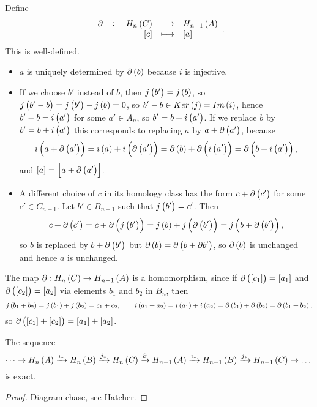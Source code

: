 Define
$$ \function[\partial]{H_n\br{C}}{H_{n - 1}\br{A}}{\sbr{c}}{\sbr{a}}. $$
This is well-defined.
\begin{itemize}
\item $ a $ is uniquely determined by $ \partial\br{b} $ because $ i $ is injective.
\item If we choose $ b' $ instead of $ b $, then $ j\br{b'} = j\br{b} $, so $ j\br{b' - b} = j\br{b'} - j\br{b} = 0 $, so $ b' - b \in Ker\br{j} = Im\br{i} $, hence $ b' - b = i\br{a'} $ for some $ a' \in A_n $, so $ b' = b + i\br{a'} $. If we replace $ b $ by $ b' = b + i\br{a'} $ this corresponds to replacing $ a $ by $ a + \partial\br{a'} $, because
$$ i\br{a + \partial\br{a'}} = i\br{a} + i\br{\partial\br{a'}} = \partial\br{b} + \partial\br{i\br{a'}} = \partial\br{b + i\br{a'}}, $$
and $ \sbr{a} = \sbr{a + \partial\br{a'}} $.
\item A different choice of $ c $ in its homology class has the form $ c + \partial\br{c'} $ for some $ c' \in C_{n + 1} $. Let $ b' \in B_{n + 1} $ such that $ j\br{b'} = c' $. Then
$$ c + \partial\br{c'} = c + \partial\br{j\br{b'}} = j\br{b} + j\br{\partial\br{b'}} = j\br{b + \partial\br{b'}}, $$
so $ b $ is replaced by $ b + \partial\br{b'} $ but $ \partial\br{b} = \partial\br{b + \partial b'} $, so $ \partial\br{b} $ is unchanged and hence $ a $ is unchanged.
\end{itemize}

\pagebreak

The map $ \partial : H_n\br{C} \to H_{n - 1}\br{A} $ is a homomorphism, since if $ \partial\br{\sbr{c_1}} = \sbr{a_1} $ and $ \partial\br{\sbr{c_2}} = \sbr{a_2} $ via elements $ b_1 $ and $ b_2 $ in $ B_n $, then
$$ j\br{b_1 + b_2} = j\br{b_1} + j\br{b_2} = c_1 + c_2, \qquad i\br{a_1 + a_2} = i\br{a_1} + i\br{a_2} = \partial\br{b_1} + \partial\br{b_2} = \partial\br{b_1 + b_2}, $$
so $ \partial\br{\sbr{c_1} + \sbr{c_2}} = \sbr{a_1} + \sbr{a_2} $.

\begin{theorem}
The sequence
$$ \dots \to H_n\br{A} \xrightarrow{i_*} H_n\br{B} \xrightarrow{j_*} H_n\br{C} \xrightarrow{\partial} H_{n - 1}\br{A} \xrightarrow{i_*} H_{n - 1}\br{B} \xrightarrow{j_*} H_{n - 1}\br{C} \to \dots $$
is exact.
\end{theorem}

\begin{proof}
Diagram chase, see Hatcher.
\end{proof}

